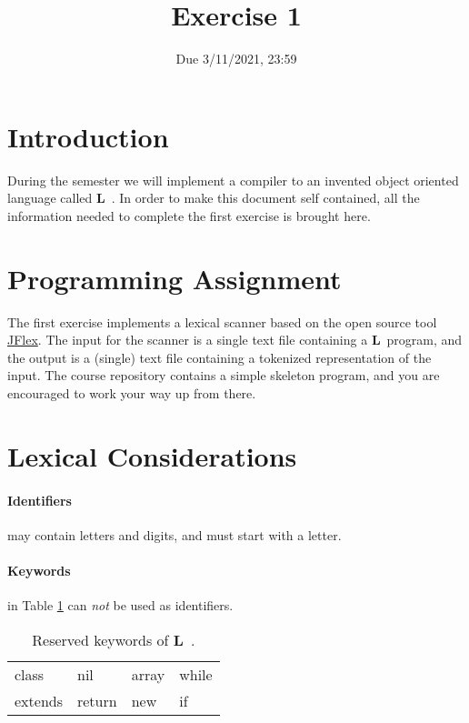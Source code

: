 \documentclass{article}
\begin{document}
\title{Exercise 1}


\date{Due 3/11/2021, 23:59}

\maketitle

\newcommand{\plname}{\textbf{L}\ }

\section{Introduction}
During the semester we will implement a compiler to an invented
object oriented language called \plname.
In order to make this document self contained,
all the information needed to complete the first exercise is brought here.

\section{Programming Assignment}
The first exercise implements a lexical scanner based on the
open source tool \href{http://jflex.de/}{JFlex}.
The input for the scanner is a single text file containing a \plname program,
and the output is a (single) text file containing a tokenized representation of the input.
The course repository contains a simple skeleton program,
and you are encouraged to work your way up from there.

\section{Lexical Considerations}
\paragraph{Identifiers} may contain letters and digits, and must start with a letter.
\paragraph{Keywords} in Table \ref{Table_Reserved_Keywords} can \textit{not}
be used as identifiers.
\begin{table}[h]
\centering
\begin{tabular}{ l l l l}
class   & nil    & array  & while \\
extends & return & new    & if    \\
\end{tabular}
\caption{
Reserved keywords of \plname.
\label{Table_Reserved_Keywords}}
\end{table}
\end{document}
